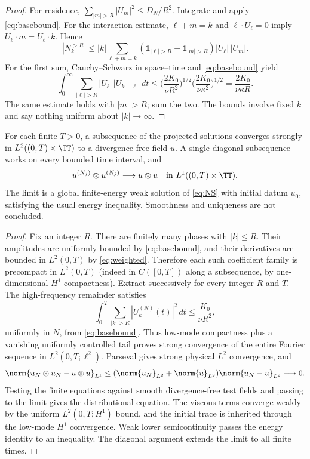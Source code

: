\begin{proof}
For residence, $\sum_{|m|>R}|U_m|^2\le D_N/R^2$. Integrate and apply \eqref{eq:basebound}. For the interaction estimate, $\ell+m=k$ and $\ell\cdot U_\ell=0$ imply $U_\ell\cdot m=U_\ell\cdot k$. Hence
\[
|N_k^{>R}|\le |k|\sum_{\ell+m=k}
(\mathbf 1_{|\ell|>R}+\mathbf 1_{|m|>R})|U_\ell|\,|U_m|.
\]
For the first sum, Cauchy--Schwarz in space--time and \eqref{eq:basebound} yield
\[
\int_0^\infty\sum_{|\ell|>R}|U_\ell|\,|U_{k-\ell}|\,dt
\le\Big(\frac{2K_0}{\nu R^2}\Big)^{1/2}
\Big(\frac{2K_0}{\nu\kappa^2}\Big)^{1/2}
=\frac{2K_0}{\nu\kappa R}.
\]
The same estimate holds with $|m|>R$; sum the two. The bounds involve fixed $k$ and say nothing uniform about $|k|\to\infty$.
\end{proof}
\begin{theorem}\label{thm:weak}
For each finite $T>0$, a subsequence of the projected solutions converges strongly in $L^2((0,T)\times\TT)$ to a divergence-free field $u$. A single diagonal subsequence works on every bounded time interval, and
\[
u^{(N_j)}\otimes u^{(N_j)}\longrightarrow u\otimes u
\quad\text{in }L^1((0,T)\times\TT).
\]
The limit is a global finite-energy weak solution of \eqref{eq:NS} with initial datum $u_0$, satisfying the usual energy inequality. Smoothness and uniqueness are not concluded.
\end{theorem}
\begin{proof}
Fix an integer $R$. There are finitely many phases with $|k|\le R$. Their amplitudes are uniformly bounded by \eqref{eq:basebound}, and their derivatives are bounded in $L^2(0,T)$ by \eqref{eq:weighted}. Therefore each such coefficient family is precompact in $L^2(0,T)$ (indeed in $C([0,T])$ along a subsequence, by one-dimensional $H^1$ compactness). Extract successively for every integer $R$ and $T$. The high-frequency remainder satisfies
\[
\int_0^T\sum_{|k|>R}|U_k^{(N)}(t)|^2\,dt
\le\frac{K_0}{\nu R^2},
\]
uniformly in $N$, from \eqref{eq:basebound}. Thus low-mode compactness plus a vanishing uniformly controlled tail proves strong convergence of the entire Fourier sequence in $L^2(0,T;\ell^2)$. Parseval gives strong physical $L^2$ convergence, and
\[
\norm{u_N\otimes u_N-u\otimes u}_{L^1}
\le(\norm{u_N}_{L^2}+\norm{u}_{L^2})\norm{u_N-u}_{L^2}\longrightarrow0.
\]
Testing the finite equations against smooth divergence-free test fields and passing to the limit gives the distributional equation. The viscous terms converge weakly by the uniform $L^2(0,T;H^1)$ bound, and the initial trace is inherited through the low-mode $H^1$ convergence. Weak lower semicontinuity passes the energy identity to an inequality. The diagonal argument extends the limit to all finite times.
\end{proof}


